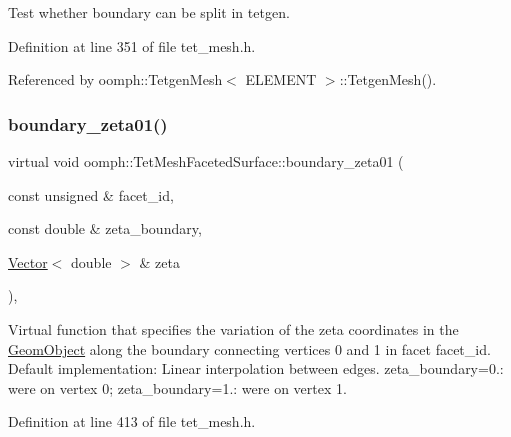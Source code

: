 Test whether boundary can be split in tetgen. 



Definition at line 351 of file tet\+\_\+mesh.\+h.



Referenced by oomph\+::\+Tetgen\+Mesh$<$ E\+L\+E\+M\+E\+N\+T $>$\+::\+Tetgen\+Mesh().

\mbox{\label{classoomph_1_1TetMeshFacetedSurface_a5882667d66ad8460782b9fa36f39f485}} 
\subsubsection{\texorpdfstring{boundary\+\_\+zeta01()}{boundary\_zeta01()}}
{\footnotesize\ttfamily virtual void oomph\+::\+Tet\+Mesh\+Faceted\+Surface\+::boundary\+\_\+zeta01 (\begin{DoxyParamCaption}\item[{const unsigned \&}]{facet\+\_\+id,  }\item[{const double \&}]{zeta\+\_\+boundary,  }\item[{\hyperlink{classoomph_1_1Vector}{Vector}$<$ double $>$ \&}]{zeta }\end{DoxyParamCaption})\hspace{0.3cm}{\ttfamily [inline]}, {\ttfamily [virtual]}}



Virtual function that specifies the variation of the zeta coordinates in the \hyperlink{classoomph_1_1GeomObject}{Geom\+Object} along the boundary connecting vertices 0 and 1 in facet facet\+\_\+id. Default implementation\+: Linear interpolation between edges. zeta\+\_\+boundary=0.\+: we\textquotesingle{}re on vertex 0; zeta\+\_\+boundary=1.\+: we\textquotesingle{}re on vertex 1. 



Definition at line 413 of file tet\+\_\+mesh.\+h.

\mbox{\label{classoomph_1_1TetMeshFacetedSurface_a7dd49826326e9926d92fc773853a9afb}} 
